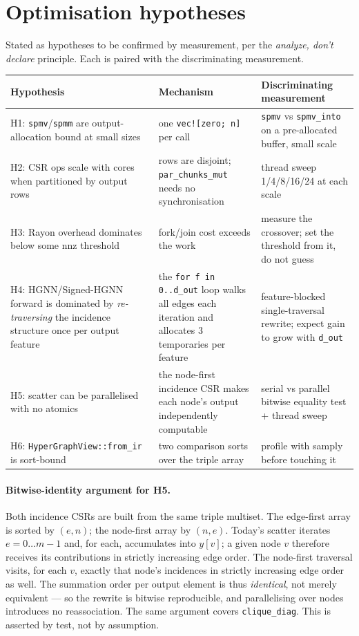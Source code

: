 \documentclass[11pt,a4paper]{article}
\begin{document}
\section{Optimisation hypotheses}

Stated as hypotheses to be confirmed by measurement, per the
\emph{analyze, don't declare} principle. Each is paired with the
discriminating measurement.

\begin{longtable}{p{}p{}p{}}
\toprule
\textbf{Hypothesis} & \textbf{Mechanism} & \textbf{Discriminating measurement} \\
\midrule
H1: \texttt{spmv}/\texttt{spmm} are output-allocation bound at small sizes
& one \texttt{vec![zero; n]} per call
& \texttt{spmv} vs \texttt{spmv\_into} on a pre-allocated buffer, small scale \\
\addlinespace
H2: CSR ops scale with cores when partitioned by output rows
& rows are disjoint; \texttt{par\_chunks\_mut} needs no synchronisation
& thread sweep 1/4/8/16/24 at each scale \\
\addlinespace
H3: Rayon overhead dominates below some nnz threshold
& fork/join cost exceeds the work
& measure the crossover; set the threshold from it, do not guess \\
\addlinespace
H4: HGNN/Signed-HGNN forward is dominated by \emph{re-traversing} the
incidence structure once per output feature
& the \texttt{for f in 0..d\_out} loop walks all edges each iteration and
allocates 3 temporaries per feature
& feature-blocked single-traversal rewrite; expect gain to grow with
\texttt{d\_out} \\
\addlinespace
H5: scatter can be parallelised with no atomics
& the node-first incidence CSR makes each node's output independently
computable
& serial vs parallel bitwise equality test + thread sweep \\
\addlinespace
H6: \texttt{HyperGraphView::from\_ir} is sort-bound
& two comparison sorts over the triple array
& profile with samply before touching it \\
\bottomrule
\end{longtable}

\paragraph{Bitwise-identity argument for H5.}
Both incidence CSRs are built from the same triple multiset. The edge-first
array is sorted by $(e,n)$; the node-first array by $(n,e)$. Today's scatter
iterates $e = 0 \ldots m-1$ and, for each, accumulates into $y[v]$; a given
node $v$ therefore receives its contributions in strictly increasing edge
order. The node-first traversal visits, for each $v$, exactly that node's
incidences in strictly increasing edge order as well. The summation order per
output element is thus \emph{identical}, not merely equivalent --- so the
rewrite is bitwise reproducible, and parallelising over nodes introduces no
reassociation. The same argument covers \texttt{clique\_diag}. This is
asserted by test, not by assumption.
\end{document}
